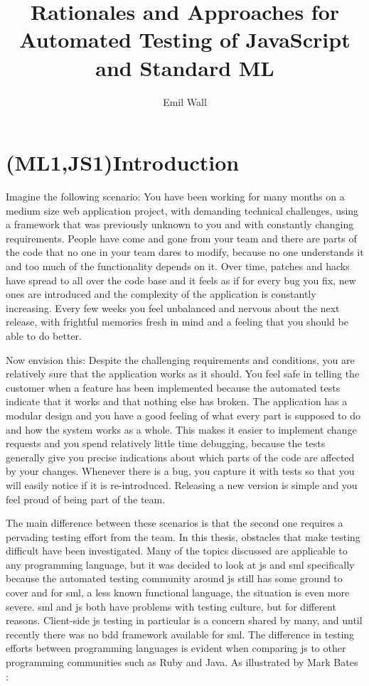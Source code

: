\documentclass[11pt]{article}
\title{Rationales and Approaches for Automated Testing of JavaScript and Standard ML}
\author{Emil Wall}
\begin{document}
%
\tableofcontents %

\printglossaries

\newpage

\section{(ML1,JS1)Introduction}

Imagine the following scenario: You have been working for many months on a medium size web application project, with demanding technical challenges, using a framework that was previously unknown to you and with constantly changing requirements. People have come and gone from your team and there are parts of the code that no one in your team dares to modify, because no one understands it and too much of the functionality depends on it. Over time, patches and hacks have spread to all over the code base and it feels as if for every bug you fix, new ones are introduced and the complexity of the application is constantly increasing. Every few weeks you feel unbalanced and nervous about the next release, with frightful memories fresh in mind and a feeling that you should be able to do better.

Now envision this: Despite the challenging requirements and conditions, you are relatively sure that the application works as it should. You feel safe in telling the customer when a feature has been implemented because the automated tests indicate that it works and that nothing else has broken. The application has a modular design and you have a good feeling of what every part is supposed to do and how the system works as a whole. This makes it easier to implement change requests and you spend relatively little time debugging, because the tests generally give you precise indications about which parts of the code are affected by your changes. Whenever there is a bug, you capture it with tests so that you will easily notice if it is re-introduced. Releasing a new version is simple and you feel proud of being part of the team.

The main difference between these scenarios is that the second one requires a pervading \gls{testing} effort from the team. In this thesis, obstacles that make \gls{testing} difficult have been investigated. Many of the topics discussed are applicable to any programming language, but it was decided to look at \gls{js} and \gls{sml} specifically because the automated testing community around \gls{js} still has some ground to cover \cite[p.~xix]{Tddjs} and for \gls{sml}, a less known functional language, the situation is even more severe.
\Gls{sml} and \gls{js} both have problems with testing culture, but for different reasons. Client-side \gls{js} testing in particular is a concern shared by many, and until recently there was no \gls{bdd} framework available for \gls{sml}.
The difference in testing efforts between programming languages is evident when comparing \gls{js} to other programming communities such as Ruby and Java. As illustrated by Mark Bates \cite{TestingStatistics}:
\end{document}
